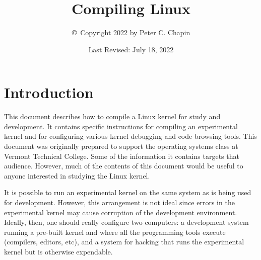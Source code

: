 \documentclass{article}
\begin{document}
\title{Compiling Linux}
\author{\copyright\ Copyright 2022 by Peter C. Chapin}
\date{Last Revised: July 18, 2022}
\maketitle

\tableofcontents
\newpage
{}

%
%
%

\section{Introduction}

This document describes how to compile a Linux kernel for study and development. It contains
specific instructions for compiling an experimental kernel and for configuring various kernel
debugging and code browsing tools. This document was originally prepared to support the
operating systems class at Vermont Technical College. Some of the information it contains
targets that audience. However, much of the contents of this document would be useful to anyone
interested in studying the Linux kernel.

It is possible to run an experimental kernel on the same system as is being used for
development. However, this arrangement is not ideal since errors in the experimental kernel may
cause corruption of the development environment. Ideally, then, one should really configure two
computers: a development system running a pre-built kernel and where all the programming tools
execute (compilers, editors, etc), and a system for hacking that runs the experimental kernel
but is otherwise expendable.
\end{document}
